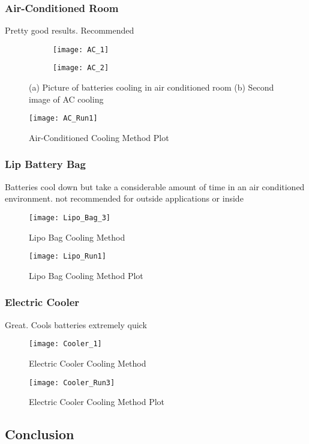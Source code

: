 \documentclass[12pt]{article}
\begin{document}
\subsubsection{Air-Conditioned Room}
Pretty good results. Recommended

\begin{figure}[H]
\centering
\begin{subfigure}[b]{0.45\textwidth}
\centering
\texttt{[image: AC\_1]}
\caption{}
\label{fig: AC Room 1}
\end{subfigure}
\hfill
\begin{subfigure}[b]{0.45\textwidth}
\centering
\texttt{[image: AC\_2]}
\caption{}
\label{fig: AC Room 2}
\end{subfigure}
\caption{(a) Picture of batteries cooling in air conditioned room (b) Second image of AC cooling}
\label{fig: AC Room}
\end{figure}

\begin{figure}[H]
	\centering
	\texttt{[image: AC\_Run1]}
	\caption{Air-Conditioned Cooling Method Plot}
	\label{fig:Air-Conditioned}
\end{figure}


\subsubsection{Lip Battery Bag}
Batteries cool down but take a considerable amount of time in an air conditioned environment. not recommended for outside applications or inside


\begin{figure}[H]
	\centering
	\texttt{[image: Lipo\_Bag\_3]}
	\caption{Lipo Bag Cooling Method}
	\label{fig:Shade}
\end{figure}

\begin{figure}[H]
	\centering
	\texttt{[image: Lipo\_Run1]}
	\caption{Lipo Bag Cooling Method Plot}
	\label{fig:Air-Conditioned}
\end{figure}

\subsubsection{Electric Cooler}
Great. Cools batteries extremely quick 

\begin{figure}[H]
	\centering
	\texttt{[image: Cooler\_1]}
	\caption{Electric Cooler Cooling Method}
	\label{fig:Cooler}
\end{figure}

\begin{figure}[H]
	\centering
	\texttt{[image: Cooler\_Run3]}
	\caption{Electric Cooler Cooling Method Plot}
	\label{fig:Air-Conditioned}
\end{figure}

\subsection{Conclusion}
\end{document}
